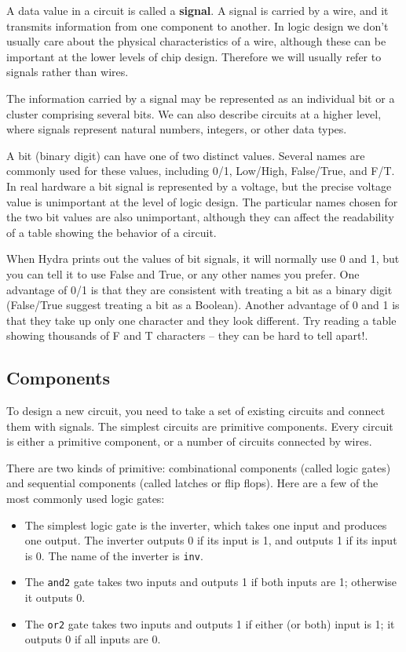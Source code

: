 \documentclass[11pt]{article}
\begin{document}
A data value in a circuit is called a \textbf{signal}.  A signal is carried
by a wire, and it transmits information from one component to another.
In logic design we don't usually care about the physical
characteristics of a wire, although these can be important at the
lower levels of chip design.  Therefore we will usually refer to
signals rather than wires.

The information carried by a signal may be represented as an
individual bit or a cluster comprising several bits.  We can also
describe circuits at a higher level, where signals represent natural
numbers, integers, or other data types.

A bit (binary digit) can have one of two distinct values.  Several
names are commonly used for these values, including 0/1, Low/High,
False/True, and F/T.  In real hardware a bit signal is represented by
a voltage, but the precise voltage value is unimportant at the level
of logic design.  The particular names chosen for the two bit values
are also unimportant, although they can affect the readability of a
table showing the behavior of a circuit.

When Hydra prints out the values of bit signals, it will normally use
0 and 1, but you can tell it to use False and True, or any other names
you prefer.  One advantage of 0/1 is that they are consistent with
treating a bit as a binary digit (False/True suggest treating a bit as
a Boolean).  Another advantage of 0 and 1 is that they take up only
one character and they look different.  Try reading a table showing
thousands of F and T characters -- they can be hard to tell apart!.

\subsection{Components}
\label{sec:org7971cec}

To design a new circuit, you need to take a set of existing circuits
and connect them with signals.  The simplest circuits are primitive
components.  Every circuit is either a primitive component, or a
number of circuits connected by wires.

There are two kinds of primitive: combinational components (called
logic gates) and sequential components (called latches or flip flops).
Here are a few of the most commonly used logic gates:

\begin{itemize}
\item The simplest logic gate is the inverter, which takes one input and
produces one output.  The inverter outputs 0 if its input is 1, and
outputs 1 if its input is 0.  The name of the inverter is \texttt{inv}.
\item The \texttt{and2} gate takes two inputs and outputs 1 if both inputs are 1;
otherwise it outputs 0.
\item The \texttt{or2} gate takes two inputs and outputs 1 if either (or both)
input is 1; it outputs 0 if all inputs are 0.
\end{itemize}
\end{document}

